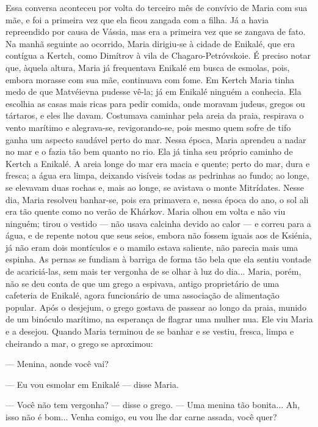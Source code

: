 Essa conversa aconteceu por volta do terceiro mês de convívio de Maria
com sua mãe, e foi a primeira vez que ela ficou zangada com a filha. Já
a havia repreendido por causa de Vássia, mas era a primeira vez que se
zangava de fato. Na manhã seguinte ao ocorrido, Maria dirigiu-se à
cidade de Enikalé, que era contígua a Kertch, como Dimítrov à vila de
Chagaro-Petróvskoie. É preciso notar que, àquela altura, Maria já
frequentava Enikalé em busca de esmolas, pois, embora morasse com sua
mãe, continuava com fome. Em Kertch Maria tinha medo de que Matvéievna
pudesse vê-la; já em Enikalé ninguém a conhecia. Ela escolhia as casas
mais ricas para pedir comida, onde moravam judeus, gregos ou tártaros, e
eles lhe davam. Costumava caminhar pela areia da praia, respirava o
vento marítimo e alegrava-se, revigorando-se, pois mesmo quem sofre de
tifo ganha um aspecto saudável perto do mar. Nessa época, Maria aprendeu
a nadar no mar e o fazia tão bem quanto no rio. Ela já tinha seu próprio
caminho de Kertch a Enikalé. A areia longe do mar era macia e quente;
perto do mar, dura e fresca; a água era limpa, deixando visíveis todas
as pedrinhas ao fundo; ao longe, se elevavam duas rochas e, mais ao
longe, se avistava o monte Mitrídates. Nesse dia, Maria resolveu
banhar-se, pois era primavera e, nessa época do ano, o sol ali era tão
quente como no verão de Khárkov. Maria olhou em volta e não viu ninguém;
tirou o vestido --- não usava calcinha devido ao calor --- e correu para
a água, e de repente notou que seus seios, embora não fossem iguais aos
de Ksiénia, já não eram dois montículos e o mamilo estava saliente, não
parecia mais uma espinha. As pernas se fundiam à barriga de forma tão
bela que ela sentiu vontade de acariciá-las, sem mais ter vergonha de se
olhar à luz do dia... Maria, porém, não se deu conta de que um grego a
espivava, antigo proprietário de uma cafeteria de Enikalé, agora
funcionário de uma associação de alimentação popular. Após o desjejum, o
grego gostava de passear ao longo da praia, munido de um binóculo
marítimo, na esperança de flagrar uma mulher nua. Ele viu Maria e a
desejou. Quando Maria terminou de se banhar e se vestiu, fresca, limpa e
cheirando a mar, o grego se aproximou:

--- Menina, aonde você vai?

--- Eu vou esmolar em Enikalé --- disse Maria.

--- Você não tem vergonha? --- disse o grego. --- Uma menina tão
bonita... Ah, isso não é bom... Venha comigo, eu vou lhe dar carne
assada, você quer?

